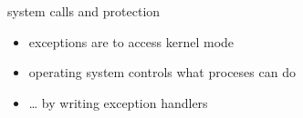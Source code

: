 \begin{frame}{system calls and protection}
\begin{itemize}
\item exceptions are  to access kernel mode
\item operating system controls what proceses can do
\item \ldots{} by writing exception handlers 
\end{itemize}
\end{frame}
